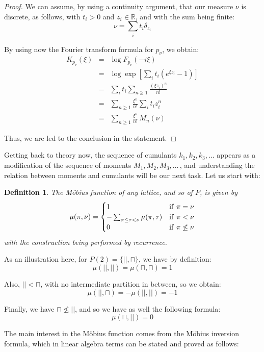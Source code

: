 \documentclass[12pt]{amsbook}
\newtheorem{definition}[theorem]{Definition}
\begin{document}
\begin{proof}
We can assume, by using a continuity argument, that our measure $\nu$ is discrete, as follows, with $t_i>0$ and $z_i\in\mathbb R$, and with the sum being finite:
$$\nu=\sum_i t_i\delta_{z_i}$$

By using now the Fourier transform formula for $p_\nu$, we obtain:
\begin{eqnarray*}
K_{p_\nu}(\xi)
&=&\log F_{p_\nu}(-i\xi)\\
&=&\log\exp\left[\sum_it_i(e^{\xi z_i}-1)\right]\\
&=&\sum_it_i\sum_{n\geq1}\frac{(\xi z_i)^n}{n!}\\
&=&\sum_{n\geq1}\frac{\xi^n}{n!}\sum_it_iz_i^n\\
&=&\sum_{n\geq1}\frac{\xi^n}{n!}\,M_n(\nu)
\end{eqnarray*}

Thus, we are led to the conclusion in the statement.
\end{proof}

Getting back to theory now, the sequence of cumulants $k_1,k_2,k_3,\ldots$ appears as a modification of the sequence of moments $M_1,M_2,M_3,\ldots\,$, and understanding the relation between moments and cumulants will be our next task. Let us start with:


\begin{definition}
The M\"obius function of any lattice, and so of $P$, is given by
$$\mu(\pi,\nu)=\begin{cases}
1&{\rm if}\ \pi=\nu\\
-\sum_{\pi\leq\tau<\nu}\mu(\pi,\tau)&{\rm if}\ \pi<\nu\\
0&{\rm if}\ \pi\not\leq\nu
\end{cases}$$
with the construction being performed by recurrence.
\end{definition}

As an illustration here, for $P(2)=\{||,\sqcap\}$, we have by definition:
$$\mu(||,||)=\mu(\sqcap,\sqcap)=1$$

Also, $||<\sqcap$, with no intermediate partition in between, so we obtain:
$$\mu(||,\sqcap)=-\mu(||,||)=-1$$

Finally, we have $\sqcap\not\leq||$, and so we have as well the following formula:
$$\mu(\sqcap,||)=0$$

The main interest in the M\"obius function comes from the M\"obius inversion formula, which in linear algebra terms can be stated and proved as follows:
\end{document}
